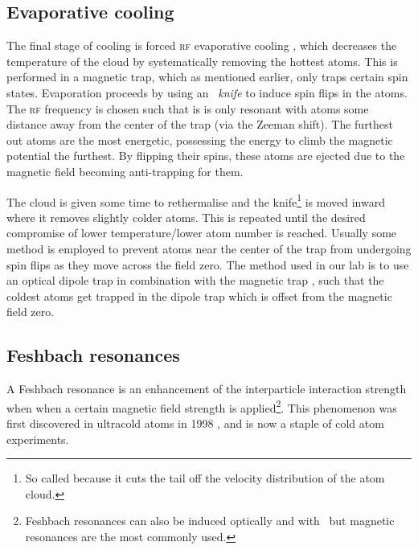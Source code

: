 \subsection{Evaporative cooling}

The final stage of cooling is forced \textsc{rf} evaporative cooling \cite{hess_evaporative_1986, anderson_observation_1995}, which decreases the temperature of the cloud by systematically removing the hottest atoms. This is performed in a magnetic trap, which as mentioned earlier, only traps certain spin states. Evaporation proceeds by using an \emph{\rf\ knife} to induce spin flips in the atoms. The \textsc{rf} frequency is chosen such that is is only resonant with atoms some distance away from the center of the trap (via the Zeeman shift). The furthest out atoms are the most energetic, possessing the energy to climb the magnetic potential the furthest. By flipping their spins, these atoms are ejected due to the magnetic field becoming anti-trapping for them.

The cloud is given some time to rethermalise and the knife\footnote{So called because it cuts the tail off the velocity distribution of the atom cloud.} is moved inward where it removes slightly colder atoms. This is repeated until the desired compromise of lower temperature/lower atom number is reached. Usually some method is employed to prevent atoms near the center of the trap from undergoing spin flips \cite{brink_majorana_2006} as they move across the field zero. The method used in our lab is to use an optical dipole trap in combination with the magnetic trap \cite{lin_rapid_2009}, such that the coldest atoms get trapped in the dipole trap which is offset from the magnetic field zero.

\subsection{Feshbach resonances}

A Feshbach resonance \cite{chin_feshbach_2010} is an enhancement of the interparticle interaction strength when when a certain magnetic field strength is applied\footnote{Feshbach resonances can also be induced optically and with \rf\, but magnetic resonances are the most commonly used.}. This phenomenon was first discovered in ultracold atoms in 1998 \cite{inouye_observation_1998}, and is now a staple of cold atom experiments.

